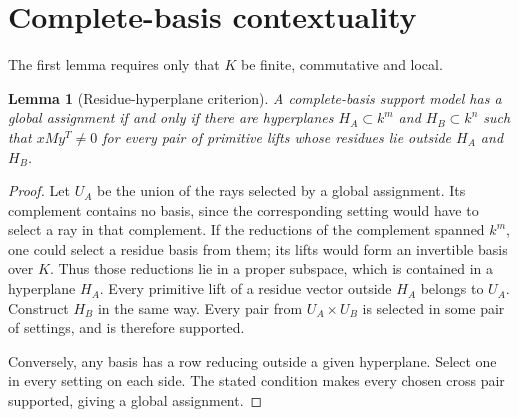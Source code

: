 \documentclass[11pt]{article}
\newtheorem{lemma}[theorem]{Lemma}
\theoremstyle{definition}\newtheorem{definition}[theorem]{Definition}
\theoremstyle{remark}\newtheorem{remark}[theorem]{Remark}
\begin{document}
\section{Complete-basis contextuality}\label{sec:classification}
The first lemma requires only that $K$ be finite, commutative and local.
\begin{lemma}[Residue-hyperplane criterion]\label{lem:hyperplane}
A complete-basis support model has a global assignment if and only if there are hyperplanes $H_A\subset k^m$ and $H_B\subset k^n$ such that $xMy^T\ne0$ for every pair of primitive lifts whose residues lie outside $H_A$ and $H_B$.
\end{lemma}
\begin{proof}
Let $U_A$ be the union of the rays selected by a global assignment. Its complement contains no basis, since the corresponding setting would have to select a ray in that complement. If the reductions of the complement spanned $k^m$, one could select a residue basis from them; its lifts would form an invertible basis over $K$. Thus those reductions lie in a proper subspace, which is contained in a hyperplane $H_A$. Every primitive lift of a residue vector outside $H_A$ belongs to $U_A$. Construct $H_B$ in the same way. Every pair from $U_A\times U_B$ is selected in some pair of settings, and is therefore supported.

Conversely, any basis has a row reducing outside a given hyperplane. Select one in every setting on each side. The stated condition makes every chosen cross pair supported, giving a global assignment.
\end{proof}
\end{document}
